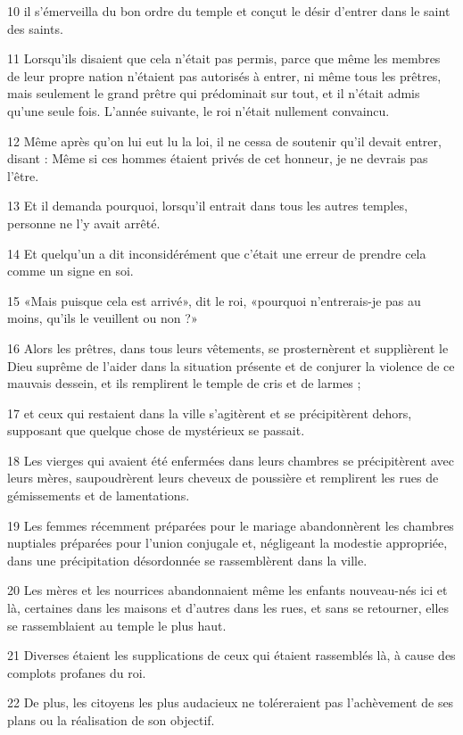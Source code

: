 \par 10 il s'émerveilla du bon ordre du temple et conçut le désir d'entrer dans le saint des saints.
\par 11 Lorsqu'ils disaient que cela n'était pas permis, parce que même les membres de leur propre nation n'étaient pas autorisés à entrer, ni même tous les prêtres, mais seulement le grand prêtre qui prédominait sur tout, et il n'était admis qu'une seule fois. L’année suivante, le roi n’était nullement convaincu.
\par 12 Même après qu'on lui eut lu la loi, il ne cessa de soutenir qu'il devait entrer, disant : Même si ces hommes étaient privés de cet honneur, je ne devrais pas l'être.
\par 13 Et il demanda pourquoi, lorsqu'il entrait dans tous les autres temples, personne ne l'y avait arrêté.
\par 14 Et quelqu'un a dit inconsidérément que c'était une erreur de prendre cela comme un signe en soi.
\par 15 «Mais puisque cela est arrivé», dit le roi, «pourquoi n'entrerais-je pas au moins, qu'ils le veuillent ou non ?»
\par 16 Alors les prêtres, dans tous leurs vêtements, se prosternèrent et supplièrent le Dieu suprême de l'aider dans la situation présente et de conjurer la violence de ce mauvais dessein, et ils remplirent le temple de cris et de larmes ;
\par 17 et ceux qui restaient dans la ville s'agitèrent et se précipitèrent dehors, supposant que quelque chose de mystérieux se passait.
\par 18 Les vierges qui avaient été enfermées dans leurs chambres se précipitèrent avec leurs mères, saupoudrèrent leurs cheveux de poussière et remplirent les rues de gémissements et de lamentations.
\par 19 Les femmes récemment préparées pour le mariage abandonnèrent les chambres nuptiales préparées pour l'union conjugale et, négligeant la modestie appropriée, dans une précipitation désordonnée se rassemblèrent dans la ville.
\par 20 Les mères et les nourrices abandonnaient même les enfants nouveau-nés ici et là, certaines dans les maisons et d'autres dans les rues, et sans se retourner, elles se rassemblaient au temple le plus haut.
\par 21 Diverses étaient les supplications de ceux qui étaient rassemblés là, à cause des complots profanes du roi.
\par 22 De plus, les citoyens les plus audacieux ne toléreraient pas l'achèvement de ses plans ou la réalisation de son objectif.
